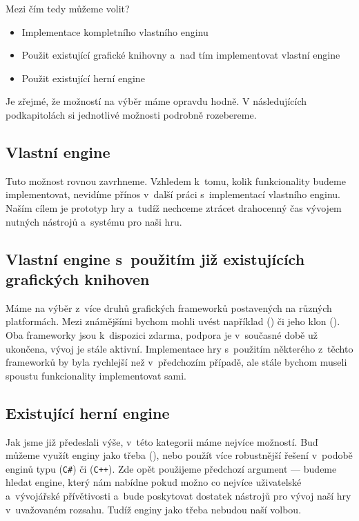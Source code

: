 Mezi čím tedy můžeme volit?
\begin{itemize}
	\item Implementace kompletního vlastního enginu
	\item Použit existující grafické knihovny a~nad tím implementovat vlastní engine
	\item Použit existující herní engine
\end{itemize}

Je zřejmé, že možností na výběr máme opravdu hodně. V následujících podkapitolách si jednotlivé možnosti podrobně rozebereme.

\subsection{Vlastní engine}
Tuto možnost rovnou zavrhneme. Vzhledem k~tomu, kolik funkcionality budeme implementovat, nevidíme přínos v~další práci s~implementací vlastního enginu. Naším cílem je prototyp hry a~tudíž nechceme ztrácet drahocenný čas vývojem nutných nástrojů a~systému pro naši hru.


\subsection{Vlastní engine s~použitím již existujících grafických knihoven}
Máme na výběr z~více druhů grafických frameworků postavených na různých platformách. Mezi známějšími bychom mohli uvést například \XNA{} (\CS{}) či jeho klon \MG{} (\CS{}). Oba frameworky jsou k~dispozici zdarma, podpora \XNA{} je v~současné době už ukončena, vývoj \MG{} je stále aktivní. Implementace hry s~použitím některého z~těchto frameworků by byla rychlejší než v~předchozím případě, ale stále bychom museli spoustu funkcionality implementovat sami. 

\subsection{Existující herní engine}
Jak jsme již předeslali výše, v~této kategorii máme nejvíce možností. Buď můžeme využít enginy jako třeba\OG{} (\CPP{}), nebo použít více robustnější řešení v~podobě enginů typu \UN{} (\texttt{C\#}) či \UE{} (\texttt{C++}). Zde opět použijeme předchozí argument --- budeme hledat engine, který nám nabídne pokud možno co nejvíce uživatelské a~vývojářské přívětivosti a~bude poskytovat dostatek nástrojů pro vývoj naší hry v~uvažovaném rozsahu. Tudíž enginy jako třeba \OG{} nebudou naší volbou.

